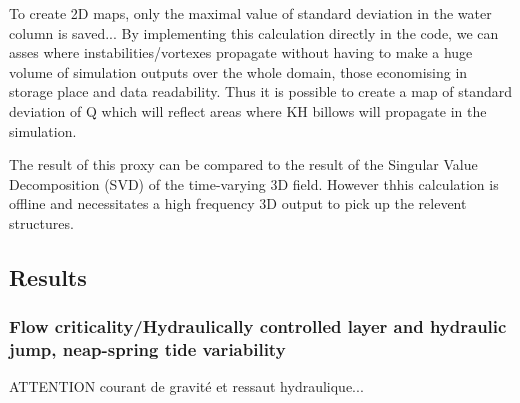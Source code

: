 To create 2D maps, only the maximal value of standard deviation in the water column is saved...
By implementing this calculation directly in the code, we can asses where instabilities/vortexes propagate without having to make a huge volume of simulation outputs over the whole domain, those economising in storage place and data readability. Thus it is possible to create a map of standard deviation of Q which will reflect areas where KH billows will propagate in the simulation.

The result of this proxy can be compared to the result of the Singular Value Decomposition (SVD) of the time-varying 3D field. However thhis calculation is offline and necessitates a high frequency 3D output to pick up the relevent structures.



\subsection{Results}


\subsubsection{Flow criticality/Hydraulically controlled layer and hydraulic jump, neap-spring tide variability}

ATTENTION courant de gravité et ressaut hydraulique...


